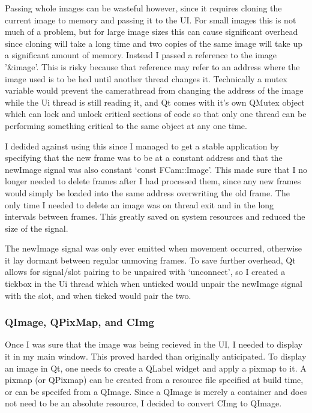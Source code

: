 \documentclass[11pt]{article} %
\begin{document}
Passing whole images can be wasteful however, since it requires cloning the current image to memory and passing it to the UI. For small images this is not much of a problem, but for large image sizes this can cause significant overhead since cloning will take a long time and two copies of the same image will take up a significant amount of memory. Instead I passed a reference to the image '\&image'. This is risky because that reference may refer to an address where the image used is to be hed until another thread changes it. Technically a mutex variable would prevent the camerathread from changing the address of the image while the Ui thread is still reading it, and Qt comes with it’s own QMutex object which can lock and unlock critical sections of code so that only one thread can be performing something critical to the same object at any one time.

I dedided against using this since I managed to get a stable application by specifying that the new frame was to be at a constant address and that the newImage signal was also constant ‘const FCam::Image’. This made sure that I no longer needed to delete frames after I had processed them, since any new frames would simply be loaded into the same address overwriting the old frame. The only time I needed to delete an image was on thread exit and in the long intervals between frames. This greatly saved on system resources and reduced the size of the signal.

The newImage signal was only ever emitted when movement occurred, otherwise it lay dormant between regular unmoving frames.
To save further overhead, Qt allows for signal/slot pairing to be unpaired with ‘unconnect’, so I created a tickbox in the Ui thread which when unticked would unpair the newImage signal with the slot, and when ticked would pair the two.

\subsubsection{QImage, QPixMap, and CImg}
Once I was sure that the image was being recieved in the UI, I needed to display it in my main window. This proved harded than originally anticipated. To display an image in Qt, one needs to create a QLabel widget and apply a pixmap to it. A pixmap (or QPixmap) can be created from a resource file specified at build time, or can be specifed from a QImage. Since a QImage is merely a container and does not need to be an absolute resource, I decided to convert CImg to QImage. 
\end{document}
